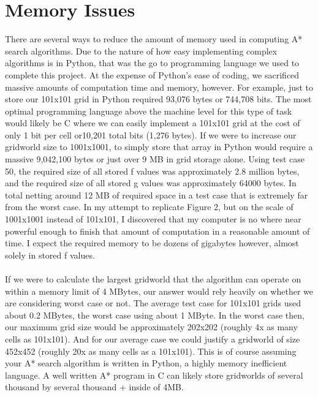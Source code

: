 \documentclass[12pt]{article}
\newcommand\tab[1][1cm]{\hspace*{#1}}
\begin{document}
\section*{Memory Issues}
\tab There are several ways to reduce the amount of memory used in computing A* search algorithms. Due to the nature of how easy implementing complex algorithms is in Python, that was the go to programming language we used to complete this project. At the expense of Python's ease of coding, we sacrificed massive amounts of computation time and memory, however. For example, just to store our 101x101 grid in Python required 93,076 bytes or 744,708 bits. The most optimal programming language above the machine level for this type of task would likely be C where we can easily implement a 101x101 grid at the cost of only 1 bit per cell or10,201 total bits (1,276 bytes). If we were to increase our gridworld size to 1001x1001, to simply store that array in Python would require a massive 9,042,100 bytes or just over 9 MB in grid storage alone. Using test case 50, the required size of all stored f values was approximately 2.8 million bytes, and the required size of all stored g values was approximately 64000 bytes. In total netting around 12 MB of required space in a test case that is extremely far from the worst case. In my attempt to replicate Figure 2, but on the scale of 1001x1001 instead of 101x101, I discovered that my computer is no where near powerful enough to finish that amount of computation in a reasonable amount of time. I expect the required memory to be dozens of gigabytes however, almost solely in stored f values. \\ \\
\tab If we were to calculate the largest gridworld that the algorithm can operate on within a memory limit of 4 MBytes, our answer would rely heavily on whether we are considering worst case or not. The average test case for 101x101 grids used about 0.2 MBytes, the worst case using about 1 MByte. In the worst case then, our maximum grid size would be approximately 202x202 (roughly 4x as many cells as 101x101). And for our average case we could justify a gridworld of size 452x452 (roughly 20x as many cells as a 101x101). This is of course assuming your A* search algorithm is written in Python, a highly memory inefficient language. A well written A* program in C can likely store gridworlds of several thousand by several thousand + inside of 4MB.
\end{document}
